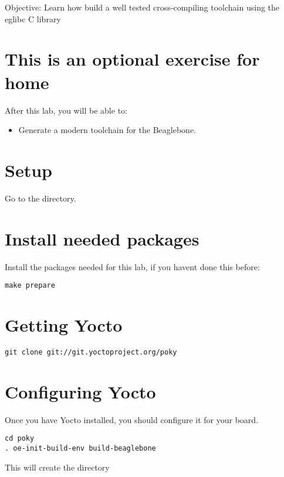   {Objective: Learn how build a well tested cross-compiling toolchain using the eglibc C
  library}

\section{This is an optional exercise for home}

After this lab, you will be able to:

\begin{itemize}
\item Generate a modern toolchain for the Beaglebone.
\end{itemize}

\section{Setup}

Go to the \labdir directory.

\section{Install needed packages}

Install the packages needed for this lab, if you havent done this before:

\begin{verbatim}
make prepare
\end{verbatim}

\section{Getting Yocto}

\begin{verbatim}
git clone git://git.yoctoproject.org/poky
\end{verbatim}

\clearpage
\section{Configuring Yocto}

Once you have Yocto installed, you should configure it for your board.

\begin{verbatim}
cd poky
. oe-init-build-env	build-beaglebone
\end{verbatim}

This will create the  directory

